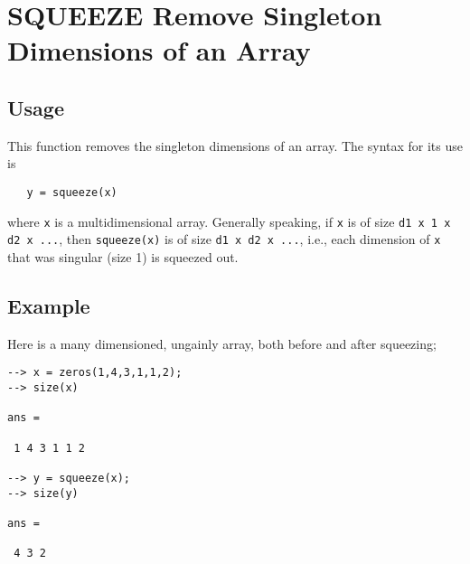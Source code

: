 \section{SQUEEZE Remove Singleton Dimensions of an Array}

\subsection{Usage}

This function removes the singleton dimensions of an array.  The
syntax for its use is
\begin{verbatim}
   y = squeeze(x)
\end{verbatim}
where \verb|x| is a multidimensional array.  Generally speaking, if
\verb|x| is of size \verb|d1 x 1 x d2 x ...|, then \verb|squeeze(x)| is of
size \verb|d1 x d2 x ...|, i.e., each dimension of \verb|x| that was
singular (size 1) is squeezed out.
\subsection{Example}

Here is a many dimensioned, ungainly array, both before and 
after squeezing;
\begin{verbatim}
--> x = zeros(1,4,3,1,1,2);
--> size(x)

ans = 

 1 4 3 1 1 2 

--> y = squeeze(x);
--> size(y)

ans = 

 4 3 2 
\end{verbatim}
